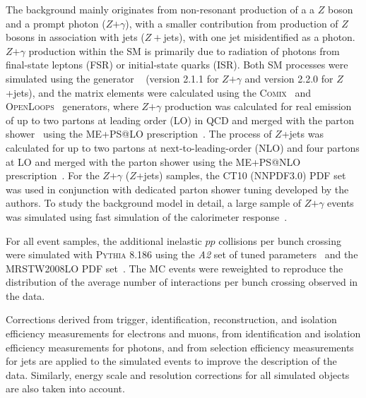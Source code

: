 The background mainly originates from non-resonant production of a a $Z$ boson and a prompt
photon ($Z$$+$$\gamma$), with a smaller contribution from production of $Z$
bosons in association with jets ($Z+$jets), with one jet misidentified as
a photon. $Z$$+$$\gamma$ production within the SM is primarily due to 
radiation of photons from final-state leptons (FSR) or initial-state quarks (ISR).
Both SM processes were simulated using the \sherpa
generator ~\cite{Gleisberg:2008ta} (version 2.1.1 for $Z$$+$$\gamma$ and version 2.2.0 for 
$Z$+jets), 
and the matrix elements were calculated using the \textsc{Comix}~\cite{Gleisberg:2008fv} and
\textsc{OpenLoops}~\cite{Cascioli:2011va} generators,
where $Z$$+$$\gamma$ production was calculated for real emission of up to two partons
at leading order (LO) in QCD and merged with the \sherpa parton
shower~\cite{Schumann:2007mg} using the ME+PS@LO
prescription~\cite{Hoeche:2009rj}. 
The process of $Z$+jets was calculated for up 
to two partons at next-to-leading-order (NLO)
and four partons at LO and merged with the parton shower using
the ME+PS@NLO prescription~\cite{Hoeche:2012yf}.
For the $Z$$+$$\gamma$ ($Z$+jets) samples, the CT10 (NNPDF3.0) PDF set was used in conjunction
with dedicated parton shower tuning developed by the \sherpa authors.
To study the background model in detail, a large sample of $Z$$+$$\gamma$ events was simulated 
using fast
simulation of the calorimeter response~\cite{fastsim}.

For all event samples, the additional inelastic $pp$ collisions per bunch crossing were simulated
with \textsc{Pythia 8.186}
using the \textit{A2} set of tuned parameters~\cite{Pythia8Tune} and the MRSTW2008LO PDF 
set~\cite{MRST}.
The MC events were reweighted to reproduce
the distribution of the average number of interactions per bunch crossing observed in the data.

Corrections derived from trigger, identification, reconstruction, and isolation efficiency
measurements for electrons and muons, from identification and isolation efficiency measurements
for photons, and from selection efficiency measurements for jets 
are applied to the simulated events to improve the description of the data.
Similarly, energy scale and resolution corrections for all simulated objects are also taken into 
account.

